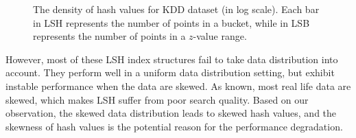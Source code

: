 \begin{figure}[!t]
	\centerline{
    }
	\caption{The density of hash values for KDD dataset (in log scale). Each bar in LSH represents the number of points in a bucket, while in LSB represents the number of points in a $z$-value range.}
	\label{fig:densitydist}
\end{figure}


However, most of these LSH index structures fail to take data distribution into account. They perform well in a uniform data distribution setting, but exhibit instable performance when the data are skewed. As known, most real life data are skewed, which makes LSH suffer from poor search quality. Based on our observation, the skewed data distribution leads to skewed hash values, and the skewness of hash values is the potential reason for the performance degradation. 

